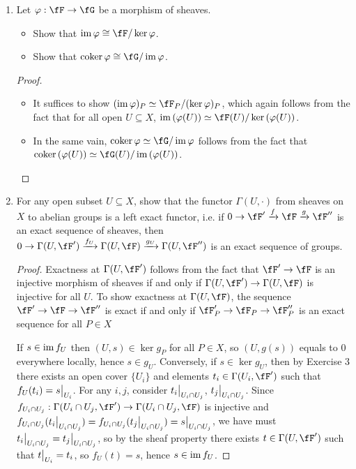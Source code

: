 \documentclass[a4paper]{article}
\begin{document}
\begin{enumerate} [label=\textbf{\arabic*.}, leftmargin=0em]
    \item[\textbf{7.}] Let $\varphi : \fF \to \fG$ be a morphism of sheaves.
          \begin{itemize}
              \item[(a)] Show that $\im{\varphi} \cong \fF / \ker{\varphi}$.
              \item[(b)] Show that $\coker{\varphi} \cong \fG / \im{\varphi}$.
          \end{itemize}

          \begin{proof} $ $ \vspace{0pt}
              \begin{itemize} [leftmargin=0cm]
                  \item[(a)] It suffices to show $(\im{\varphi})_P \simeq \fF_P / (\ker{\varphi})_P$, which again follows from the fact that for all open $U \subseteq X$, $\im{(\varphi(U))} \simeq \fF(U) / \ker{(\varphi(U))}$.

                  \item[(b)] In the same vain, $\coker{\varphi} \simeq \fG / \im{\varphi}$ follows from the fact that $\coker{(\varphi(U))} \simeq \fG(U) / \im{(\varphi(U))}$.
              \end{itemize}
          \end{proof}

    \item[\textbf{8.}] For any open subset $U \subseteq X$, show that the functor $\Gamma(U, \cdot)$ from sheaves on $X$ to abelian groups is a left exact functor, i.e. if $0 \to \fF' \xrightarrow{f} \fF \xrightarrow{g} \fF''$ is an exact sequence of sheaves, then $0 \to \Gamma(U, \fF') \xrightarrow{f_U} \Gamma(U, \fF) \xrightarrow{g_U} \Gamma(U, \fF'')$ is an exact sequence of groups.

          \begin{proof}
              Exactness at $\Gamma(U, \fF')$ follows from the fact that $\fF' \to \fF$ is an injective morphism of sheaves if and only if $\Gamma(U, \fF') \to \Gamma(U, \fF)$ is injective for all $U$. To show exactness at $\Gamma(U, \fF)$, the sequence $\fF' \to \fF \to \fF''$ is exact if and only if $\fF'_P \to \fF_P \to \fF''_P$ is an exact sequence for all $P \in X$

              If $s \in \operatorname{im}{f_U}$ then $(U, s) \in \ker{g_P}$ for all $P \in X$, so $(U, g(s))$ equals to $0$ everywhere locally, hence $s \in g_U$. Conversely, if $s \in \ker{g_U}$, then by Exercise 3 there exists an open cover $\{ U_i \}$ and elements $t_i \in \Gamma(U_i, \fF')$ such that $f_U(t_i) = \restr{s}{U_i}$. For any $i, j$, consider $\restr{t_i}{U_i \cap U_j}$, $\restr{t_j}{U_i \cap U_j}$. Since $f_{U_{i} \cap U_j} : \Gamma(U_i \cap U_j, \fF') \to \Gamma(U_i \cap U_j, \fF)$ is injective and $f_{U_i \cap U_j}(\restr{t_i}{U_i \cap U_j}) = f_{U_i \cap U_j}(\restr{t_{j}}{U_i \cap U_j}) = \restr{s}{U_i \cap U_j}$, we have must $\restr{t_i}{U_i \cap U_j} = \restr{t_j}{U_i \cap U_j}$, so by the sheaf property there exists $t \in \Gamma(U, \fF')$ such that $\restr{t}{U_i} = t_i$, so $f_U(t) = s$, hence $s \in \operatorname{im}{f_U}$.
          \end{proof}


\end{enumerate}
\end{document}
